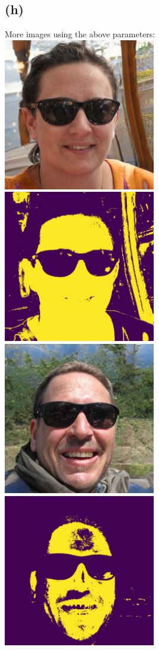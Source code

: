 \subsection*{(h)}
More images using the above parameters: \\
\includegraphics[width=0.5\textwidth]{person_1.jpg}
\includegraphics[width=0.5\textwidth]{person_1_skin.png}
\includegraphics[width=0.5\textwidth]{person_2.jpg}
\includegraphics[width=0.5\textwidth]{person_2_skin.png}
